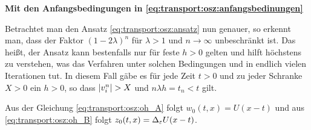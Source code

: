 \noindent \textbf{Mit den Anfangsbedingungen in \eqref{eq:transport:osz:anfangsbedinungen}}

\vspace{0.4cm}
Betrachtet man den Ansatz \eqref{eq:transport:osz:ansatz} nun genauer, so erkennt man, dass der Faktor $(1 - 2\lambda)^n$ für $\lambda > 1$ und $n \to \infty$ unbeschränkt ist.
Das heißt, der Ansatz kann bestenfalls nur für feste $h > 0$ gelten und hilft höchstens zu verstehen, was das Verfahren unter solchen Bedingungen und in endlich vielen Iterationen tut.
In diesem Fall gäbe es für jede Zeit $t > 0$ und zu jeder Schranke $X > 0$ ein $h > 0$, so dass $\left| v^n_i \right| > X$ und $n \lambda h = t_n < t$ gilt.

Aus der Gleichung \eqref{eq:transport:osz:oh_A} folgt $w_0(t, x) = U(x - t)$ und aus \eqref{eq:transport:osz:oh_B} folgt $z_0(t, x) = \Delta_\varepsilon U(x - t)$.

